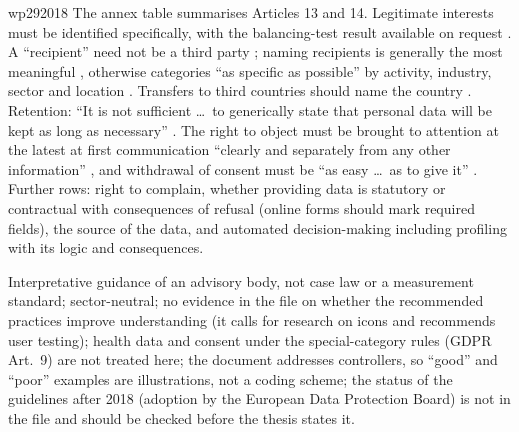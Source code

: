 \begin{papercard}{wp292018}
 The annex table summarises Articles 13 and 14. Legitimate interests must be identified specifically, with the balancing-test result available on request . A ``recipient'' need not be a third party ; naming recipients is generally the most meaningful , otherwise categories ``as specific as possible'' by activity, industry, sector and location . Transfers to third countries should name the country . Retention: ``It is not sufficient \ldots\ to generically state that personal data will be kept as long as necessary'' . The right to object must be brought to attention at the latest at first communication ``clearly and separately from any other information'' , and withdrawal of consent must be ``as easy \ldots\ as to give it'' . Further rows: right to complain, whether providing data is statutory or contractual with consequences of refusal (online forms should mark required fields), the source of the data, and automated decision-making including profiling with its logic and consequences.

 Interpretative guidance of an advisory body, not case law or a measurement standard; sector-neutral; no evidence in the file on whether the recommended practices improve understanding (it calls for research on icons and recommends user testing); health data and consent under the special-category rules (GDPR Art.~9) are not treated here; the document addresses controllers, so ``good'' and ``poor'' examples are illustrations, not a coding scheme; the status of the guidelines after 2018 (adoption by the European Data Protection Board) is not in the file and should be checked before the thesis states it.


\end{papercard}
